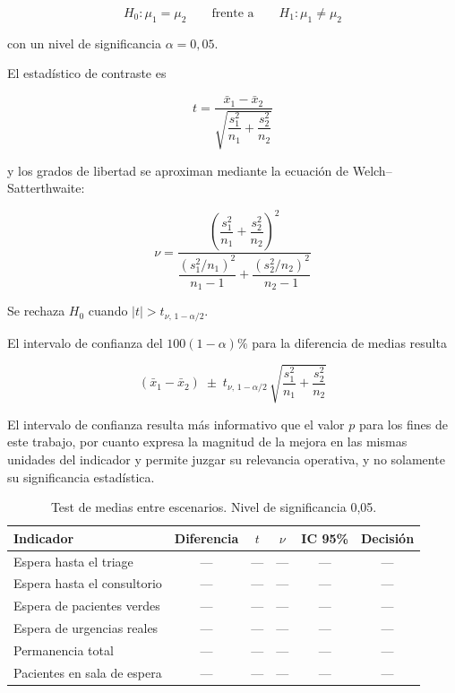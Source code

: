 \documentclass{article}
\begin{document}
\[
H_0: \mu_1 = \mu_2
\qquad\text{frente a}\qquad
H_1: \mu_1 \neq \mu_2
\]

con un nivel de significancia $\alpha = 0{,}05$.

El estadístico de contraste es

\begin{equation}
t = \frac{\bar{x}_1 - \bar{x}_2}
         {\sqrt{\dfrac{s_1^2}{n_1} + \dfrac{s_2^2}{n_2}}}
\label{eq:t}
\end{equation}

y los grados de libertad se aproximan mediante la ecuación de
Welch--Satterthwaite:

\begin{equation}
\nu = \frac{\left(\dfrac{s_1^2}{n_1} + \dfrac{s_2^2}{n_2}\right)^{\!2}}
           {\dfrac{\left(s_1^2/n_1\right)^2}{n_1 - 1} +
            \dfrac{\left(s_2^2/n_2\right)^2}{n_2 - 1}}
\label{eq:welch}
\end{equation}

Se rechaza $H_0$ cuando $|t| > t_{\nu,\,1-\alpha/2}$.

El intervalo de confianza del $100(1-\alpha)\%$ para la diferencia de medias
resulta

\begin{equation}
(\bar{x}_1 - \bar{x}_2) \;\pm\;
t_{\nu,\,1-\alpha/2}\,
\sqrt{\frac{s_1^2}{n_1} + \frac{s_2^2}{n_2}}
\label{eq:ic}
\end{equation}

El intervalo de confianza resulta más informativo que el valor $p$ para los
fines de este trabajo, por cuanto expresa la magnitud de la mejora en las
mismas unidades del indicador y permite juzgar su relevancia operativa, y no
solamente su significancia estadística.

\begin{table}[H]
\centering
\small
\begin{tabular}{lccccc}
\toprule
\textbf{Indicador} & \textbf{Diferencia} & $t$ & $\nu$ & \textbf{IC 95\%} & \textbf{Decisión} \\
\midrule
Espera hasta el triage      & --- & --- & --- & --- & --- \\
Espera hasta el consultorio & --- & --- & --- & --- & --- \\
Espera de pacientes verdes  & --- & --- & --- & --- & --- \\
Espera de urgencias reales  & --- & --- & --- & --- & --- \\
Permanencia total           & --- & --- & --- & --- & --- \\
Pacientes en sala de espera & --- & --- & --- & --- & --- \\
\bottomrule
\end{tabular}
\caption{Test de medias entre escenarios. Nivel de significancia 0,05.}
\label{tab:test}
\end{table}
\end{document}
